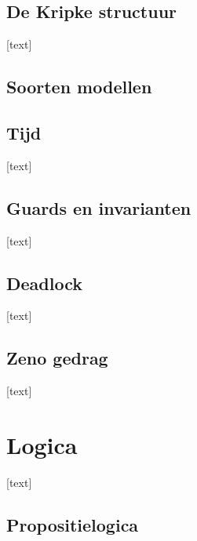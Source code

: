 \documentclass{article}
\begin{document}
		\subsection{De Kripke structuur}
		
		[text]
		
		\subsection{Soorten modellen}
		
		\newpage
		
		\subsection{Tijd}
		
		[text]
		
		\subsection{Guards en invarianten}
		
		[text]
		
		\subsection{Deadlock}
		
		[text]
		
		\subsection{Zeno gedrag}
		
		[text]
		
	\newpage
	
	
	\section{Logica}
	
	[text]
	
		\subsection{Propositielogica}
		
\end{document}
